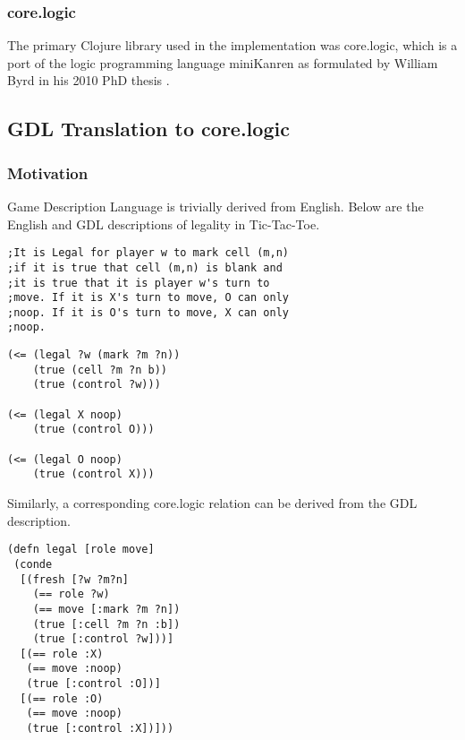 \documentclass[letterpaper]{article}
\begin{document}
\subsubsection{core.logic}
The primary Clojure library used in the implementation was core.logic, which is a port of the logic programming language miniKanren as formulated by William Byrd in his 2010 PhD thesis \cite{byrd2010relational}.



\subsection{GDL Translation to core.logic}
\subsubsection{Motivation}
Game Description Language is trivially derived from English. Below are the English and GDL descriptions of legality in Tic-Tac-Toe.
\begin{lstlisting}[frame=single, caption=The Legal relation for Tic-Tac-Toe expressed in English]
;It is Legal for player w to mark cell (m,n)
;if it is true that cell (m,n) is blank and
;it is true that it is player w's turn to
;move. If it is X's turn to move, O can only
;noop. If it is O's turn to move, X can only
;noop. 
\end{lstlisting}
\begin{lstlisting}[frame=single, caption=The Legal relation for Tic-Tac-Toe expressed in GDL]
(<= (legal ?w (mark ?m ?n))
    (true (cell ?m ?n b))
    (true (control ?w)))

(<= (legal X noop)
    (true (control O)))

(<= (legal O noop)
    (true (control X)))
\end{lstlisting}

Similarly, a corresponding core.logic relation can be derived from the GDL description.

\begin{lstlisting}[frame=single, caption=The Legal relation translated into core.logic]
(defn legal [role move]
 (conde
  [(fresh [?w ?m?n]
    (== role ?w)
    (== move [:mark ?m ?n])
    (true [:cell ?m ?n :b])
    (true [:control ?w]))]
  [(== role :X)
   (== move :noop)
   (true [:control :O])]
  [(== role :O)
   (== move :noop)
   (true [:control :X])]))
\end{lstlisting}
\end{document}
